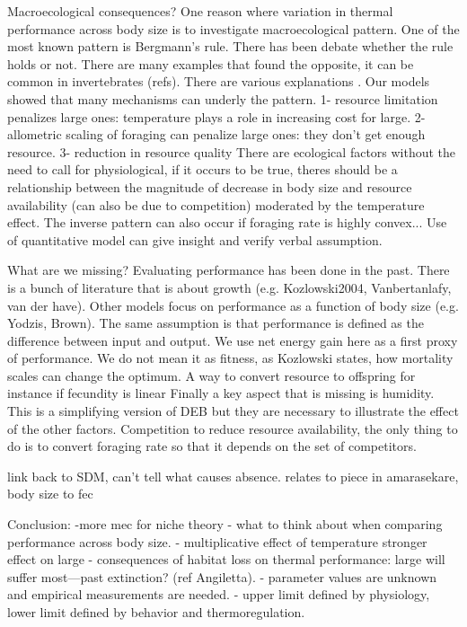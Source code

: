 Macroecological consequences?
One reason where variation in thermal performance across body size is to investigate macroecological pattern.
One of the most known pattern is Bergmann's rule.
There has been debate whether the rule holds or not.
There are many examples that found the opposite, it can be common in invertebrates (refs).
There are various explanations \citep{Chown2010}.
Our models showed that many mechanisms can underly the pattern.
1- resource limitation penalizes large ones: temperature plays a role in increasing cost for large.
2- allometric scaling of foraging can penalize large ones: they don't get enough resource. 
3- reduction in resource quality
There are ecological factors without the need to call for physiological, if it occurs to be true, theres should be a relationship between the magnitude of decrease in body size and resource availability (can also be due to competition) moderated by the temperature effect.
The inverse pattern can also occur if foraging rate is highly convex...
Use of quantitative model can give insight and verify verbal assumption.
 
What are we missing?
Evaluating performance has been done in the past.
There is a bunch of literature that is about growth  (e.g. Kozlowski2004, Vanbertanlafy, van der have). 
Other models focus on performance as a function of body size (e.g. Yodzis, Brown).
The same assumption is that performance is defined as the difference between input and output.
We use net energy gain here as a first proxy of performance.
We do not mean it as fitness, as Kozlowski states, how mortality scales can change the optimum.
A way to convert resource to offspring for instance if fecundity is linear
Finally a key aspect that is missing is humidity.
This is a simplifying version of DEB but they are necessary to illustrate the effect of the other factors.
Competition to reduce resource availability, the only thing to do is to convert foraging rate so that it depends on the set of competitors.


link back to SDM, can't tell what causes absence.
relates to piece in amarasekare, body size to fec
       
Conclusion:
-more mec for niche theory
- what to think about when comparing performance across body size.
- multiplicative effect of temperature stronger effect on large
- consequences of habitat loss on thermal performance: large will suffer most---past extinction? (ref Angiletta).
- parameter values are unknown and empirical measurements are needed.
- upper limit defined by physiology, lower limit defined by behavior and thermoregulation.
